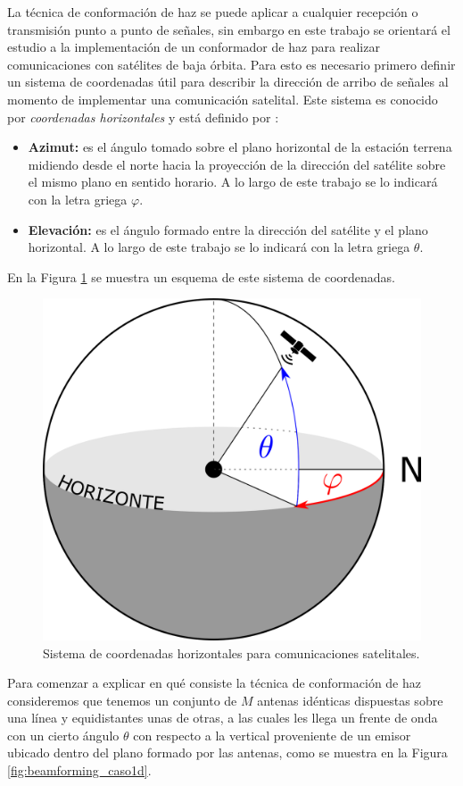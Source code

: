 La técnica de conformación de haz se puede aplicar a cualquier recepción o transmisión punto a punto de señales, sin embargo en este trabajo se orientará el estudio a la implementación de un conformador de haz para realizar comunicaciones con satélites de baja órbita. Para esto es necesario primero definir un sistema de coordenadas útil para describir la dirección de arribo de señales al momento de implementar una comunicación satelital. Este sistema es conocido por \emph{coordenadas horizontales} y está definido por \cite{bib:MaralBousquet_ch2}:

\begin{itemize}
    \item \textbf{Azimut:} es el ángulo tomado sobre el plano horizontal de la estación terrena midiendo desde el norte hacia la proyección de la dirección del satélite sobre el mismo plano en sentido horario. A lo largo de este trabajo se lo indicará con la letra griega $\varphi$.
    \item \textbf{Elevación:} es el ángulo formado entre la dirección del satélite y el plano horizontal. A lo largo de este trabajo se lo indicará con la letra griega $\theta$.
\end{itemize}

En la Figura \ref{fig:beamforming_lookangles} se muestra un esquema de este sistema de coordenadas.

\begin{figure}[ht!]
    \centering
    \includegraphics[width=0.6\linewidth]{images/02-Beamforming/lookangles.png}
    \caption{Sistema de coordenadas horizontales para comunicaciones satelitales.}
    \label{fig:beamforming_lookangles}
\end{figure}

Para comenzar a explicar en qué consiste la técnica de conformación de haz consideremos que tenemos un conjunto de $M$ antenas idénticas dispuestas sobre una línea y equidistantes unas de otras, a las cuales les llega un frente de onda con un cierto ángulo $\theta$ con respecto a la vertical proveniente de un emisor ubicado dentro del plano formado por las antenas, como se muestra en la Figura \ref{fig:beamforming_caso1d}.

